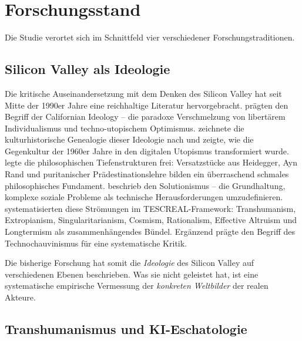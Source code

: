 \documentclass[12pt,a4paper]{article}
\begin{document}
\section{Forschungsstand}
\label{sec:forschungsstand}

Die Studie verortet sich im Schnittfeld vier verschiedener Forschungstraditionen.

\subsection{Silicon Valley als Ideologie}
\label{sec:forschungsstand:sv}

Die kritische Auseinandersetzung mit dem Denken des Silicon Valley hat seit Mitte der 1990er Jahre eine reichhaltige Literatur hervorgebracht. \citet{BarbCam1996} pr\"agten den Begriff der \glqq Californian Ideology\grqq{} -- die paradoxe Verschmelzung von libert\"arem Individualismus und techno-utopischem Optimismus. \citet{Turner2006} zeichnete die kulturhistorische Genealogie dieser Ideologie nach und zeigte, wie die Gegenkultur der 1960er Jahre in den digitalen Utopismus transformiert wurde. \citet{Daub2020} legte die philosophischen Tiefenstrukturen frei: Versatzst\"ucke aus Heidegger, Ayn Rand und puritanischer Pr\"adestinationslehre bilden ein \glqq \"uberraschend schmales philosophisches Fundament\grqq. \citet{Morozov2013} beschrieb den Solutionismus -- die Grundhaltung, komplexe soziale Probleme als technische Herausforderungen umzudefinieren. \citet{TorresGebru2024} systematisierten diese Str\"omungen im TESCREAL-Framework: Transhumanism, Extropianism, Singularitarianism, Cosmism, Rationalism, Effective Altruism und Longtermism als \glqq zusammenh\"angendes B\"undel\grqq. Erg\"anzend pr\"agte \citet{Broussard2018} den Begriff des \glqq Technochauvinismus\grqq{} f\"ur eine systematische Kritik.

Die bisherige Forschung hat somit die \emph{Ideologie} des Silicon Valley auf verschiedenen Ebenen beschrieben. Was sie nicht geleistet hat, ist eine systematische empirische Vermessung der \emph{konkreten Weltbilder} der realen Akteure.


\subsection{Transhumanismus und KI-Eschatologie}
\label{sec:forschungsstand:transhumanismus}
\end{document}
